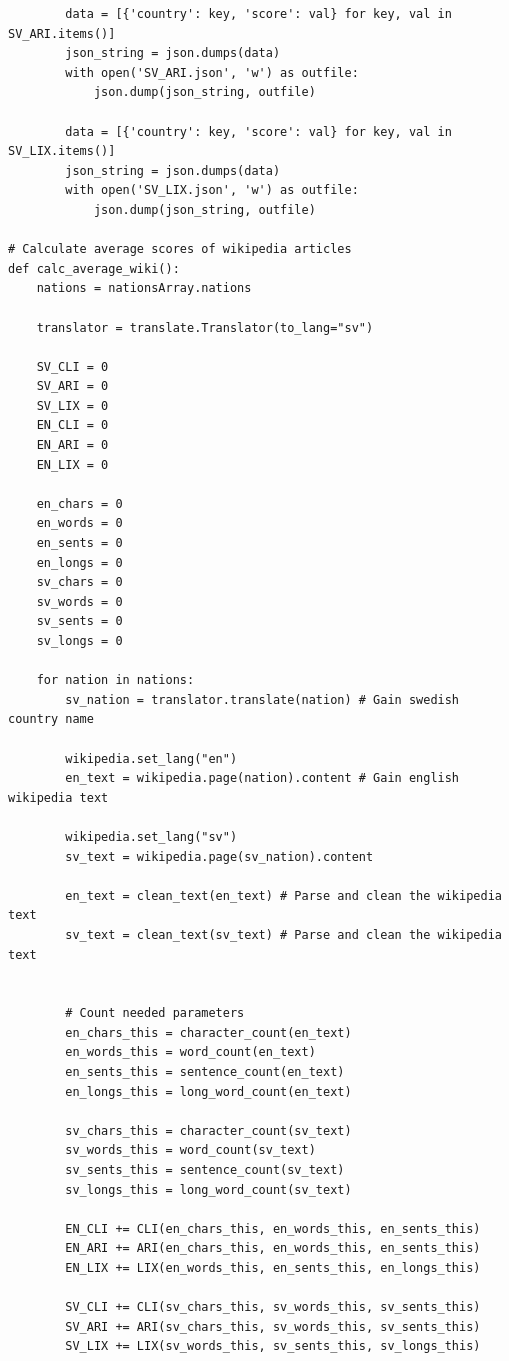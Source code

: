 \documentclass[a4paper]{article}
\begin{document}
\begin{verbatim}
        data = [{'country': key, 'score': val} for key, val in SV_ARI.items()]
        json_string = json.dumps(data)
        with open('SV_ARI.json', 'w') as outfile:
            json.dump(json_string, outfile)
    
        data = [{'country': key, 'score': val} for key, val in SV_LIX.items()]
        json_string = json.dumps(data)
        with open('SV_LIX.json', 'w') as outfile:
            json.dump(json_string, outfile)    

# Calculate average scores of wikipedia articles
def calc_average_wiki():
    nations = nationsArray.nations
    
    translator = translate.Translator(to_lang="sv")

    SV_CLI = 0
    SV_ARI = 0
    SV_LIX = 0
    EN_CLI = 0
    EN_ARI = 0
    EN_LIX = 0

    en_chars = 0
    en_words = 0
    en_sents = 0
    en_longs = 0
    sv_chars = 0
    sv_words = 0
    sv_sents = 0
    sv_longs = 0
    
    for nation in nations:
        sv_nation = translator.translate(nation) # Gain swedish country name
       
        wikipedia.set_lang("en")
        en_text = wikipedia.page(nation).content # Gain english wikipedia text
        
        wikipedia.set_lang("sv")
        sv_text = wikipedia.page(sv_nation).content
        
        en_text = clean_text(en_text) # Parse and clean the wikipedia text
        sv_text = clean_text(sv_text) # Parse and clean the wikipedia text
        
            
        # Count needed parameters
        en_chars_this = character_count(en_text)
        en_words_this = word_count(en_text)
        en_sents_this = sentence_count(en_text)
        en_longs_this = long_word_count(en_text)
        
        sv_chars_this = character_count(sv_text)
        sv_words_this = word_count(sv_text)
        sv_sents_this = sentence_count(sv_text)
        sv_longs_this = long_word_count(sv_text)
        
        EN_CLI += CLI(en_chars_this, en_words_this, en_sents_this)
        EN_ARI += ARI(en_chars_this, en_words_this, en_sents_this)
        EN_LIX += LIX(en_words_this, en_sents_this, en_longs_this)

        SV_CLI += CLI(sv_chars_this, sv_words_this, sv_sents_this)
        SV_ARI += ARI(sv_chars_this, sv_words_this, sv_sents_this)
        SV_LIX += LIX(sv_words_this, sv_sents_this, sv_longs_this)
        

\end{verbatim}
\end{document}
